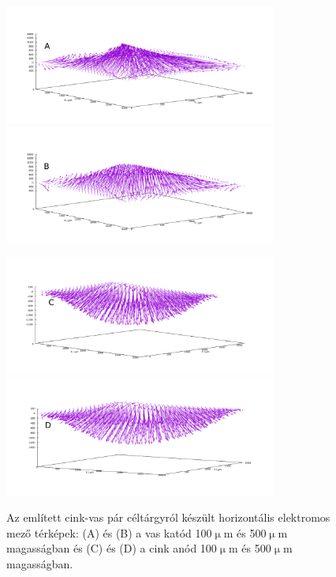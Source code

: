 \begin{figure}
\centering
\includegraphics[width=0.8\textwidth]{img/mérések/Fe_h100.pdf}
\includegraphics[width=0.8\textwidth]{img/mérések/Fe_h500.pdf}

\includegraphics[width=0.8\textwidth]{img/mérések/Zn_h100.pdf}
\includegraphics[width=0.8\textwidth]{img/mérések/Zn_h500.pdf}

\caption{Az említett cink-vas pár céltárgyról készült horizontális elektromos mező térképek:
(A) és (B) a vas katód 100$\upmu$m és 500$\upmu$m magasságban és (C) és (D) a cink anód 100$\upmu$m és 500$\upmu$m magasságban.}
\label{fig:field_h}
\end{figure}

